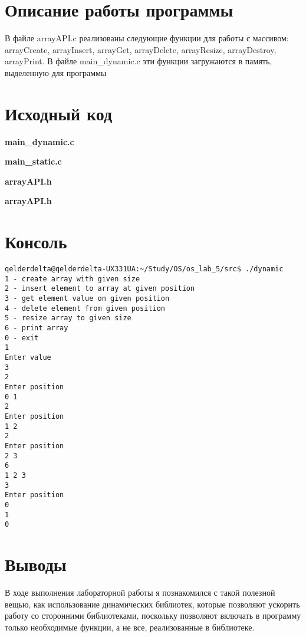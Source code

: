 \documentclass[a4paper, 12pt]{article}
\begin{document}
\section{Описание работы программы}

В файле arrayAPI.c реализованы следующие функции для работы с массивом: arrayCreate, arrayInsert, arrayGet, arrayDelete, arrayResize, arrayDestroy, arrayPrint. В файле main\_dynamic.c эти функции загружаются в память, выделенную для программы  
\newpage

\section{Исходный код}
\textbf{\large{main\_dynamic.c}}


\textbf{\large{main\_static.c}}


\textbf{\large{arrayAPI.h}}


\textbf{\large{arrayAPI.h}}

\newpage
\section{Консоль}

\begin{verbatim}
qelderdelta@qelderdelta-UX331UA:~/Study/OS/os_lab_5/src$ ./dynamic
1 - create array with given size
2 - insert element to array at given position
3 - get element value on given position
4 - delete element from given position
5 - resize array to given size
6 - print array
0 - exit
1
Enter value
3
2
Enter position
0 1
2   
Enter position
1 2
2  
Enter position
2 3
6
1 2 3 
3
Enter position
0
1
0
\end{verbatim}
\newpage
\section{Выводы}

В ходе выполнения лабораторной работы я познакомился с такой полезной вещью, как использование динамических библиотек, которые позволяют ускорить работу со сторонними библиотеками, поскольку позволяют включать в программу только необходимые функции, а не все, реализованные в библиотеке.
\end{document}
